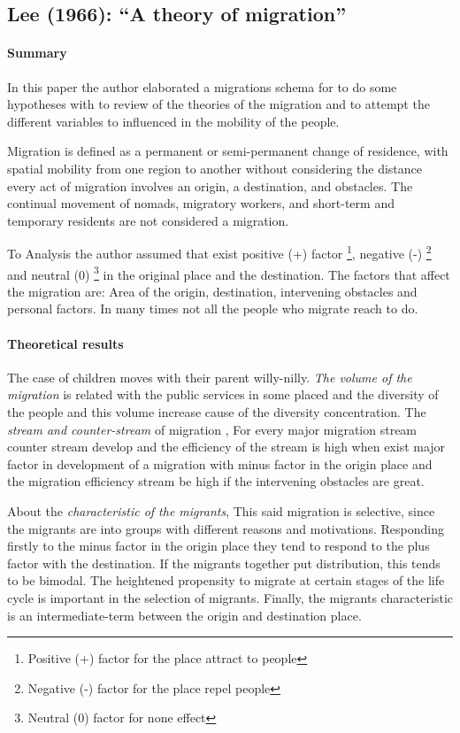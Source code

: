 \documentclass[11pt]{article}
\theoremstyle{prop}
\begin{document}
	\subsection{Lee (1966): ``A theory of migration''}
	
	\paragraph{Summary}
	In this paper the author elaborated a migrations schema for to do some hypotheses with to review of the theories of the migration and to attempt the different variables to influenced in the mobility of the people.
	
	Migration is defined as a permanent or semi-permanent change of residence, with spatial mobility from one region to another without considering the distance every act of migration involves an origin, a destination, and obstacles. The continual movement of nomads, migratory workers, and short-term and temporary residents are not considered a migration.
	
	To Analysis the author assumed that exist positive (+) factor \footnote {Positive (+) factor for the place attract to people}, negative (-) \footnote{Negative (-) factor for the place repel people} and neutral (0) \footnote{Neutral (0) factor for none effect} in the original place and the destination.  The factors that affect the migration are: Area of the origin, destination, intervening obstacles and personal factors. In many times not all the people who migrate reach to do. 
	
	\paragraph{Theoretical results}
	The case of children moves with their parent willy-nilly. \textit{The volume of the migration} is related with the public services in some placed and the diversity of the people and this volume increase cause of the diversity concentration. The \textit{stream and counter-stream} of migration , For every major migration stream counter stream develop and the efficiency of the stream is high when exist major factor in development of a migration with minus factor in the origin place and the migration efficiency stream be high if the intervening obstacles are
	great.

	About the \textit{\textit{characteristic of the migrants}}, This said migration is selective, since the migrants are into groups with different reasons and motivations. Responding firstly to the minus factor in the origin place they tend to respond to the plus factor with the destination. If the migrants together put distribution, this tends to be bimodal. The heightened propensity to migrate at certain stages of the life cycle is important in the selection of migrants. Finally, the migrants characteristic is an intermediate-term between the origin and destination place.
	 
\end{document}
